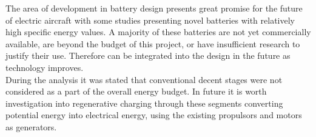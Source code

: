 The area of development in battery design presents great promise for the future of electric aircraft with some studies presenting novel batteries with relatively high specific energy values. A majority of these batteries are not yet commercially available, are beyond the budget of this project, or have insufficient research to justify their use. Therefore can be integrated into the design in the future as technology improves. \\

During the analysis it was stated that conventional decent stages were not considered as a part of the overall energy budget. In future it is worth investigation into regenerative charging through these segments converting potential energy into electrical energy, using the existing propulsors and motors as generators. 